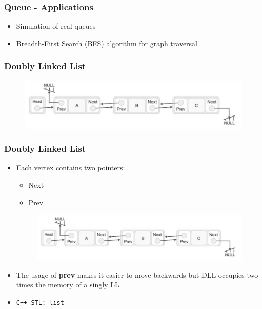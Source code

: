 \documentclass{beamer}
\begin{document}
\begin{frame}
\frametitle{Queue - Applications}
	\begin{itemize}
		\item Simulation of real queues
		\item Breadth-First Search (BFS) algorithm for graph traversal
	\end{itemize}
\end{frame}

\begin{frame}
\frametitle{Doubly Linked List}
	\begin{figure}
		\centering
		\includegraphics[scale=0.5]{imgs/2-LDS/dll/dll.png}
	\end{figure}
\end{frame}

\begin{frame}[fragile]
\frametitle{Doubly Linked List}
	\begin{itemize}
		\item Each vertex contains two pointers:
			\begin{itemize}
				\item Next
				\item Prev
			\end{itemize}
			\begin{figure}
				\centering
				\includegraphics[scale=0.3]{imgs/2-LDS/dll/dll.png}
			\end{figure}
		\item The usage of \textbf{prev} makes it easier to move backwards but DLL occupies two times the memory of a singly LL
		\item \verb|C++ STL: list|
	\end{itemize}
\end{frame}
\end{document}
